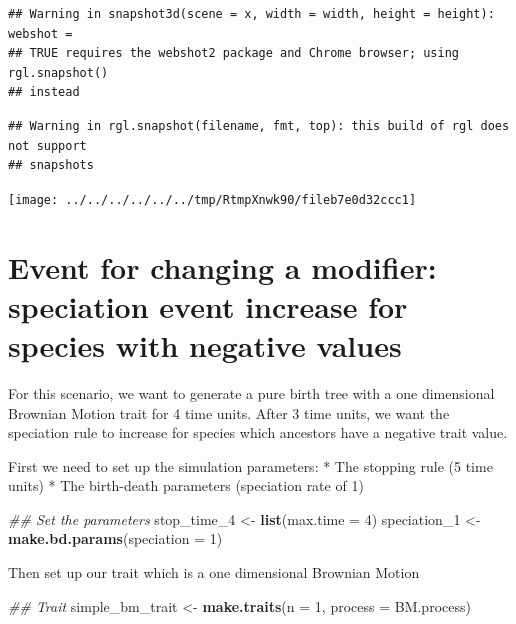 \documentclass[
]{book}
\newenvironment{Shaded}{\begin{snugshade}}{\end{snugshade}}
\newcommand{\CommentTok}[1]{\textcolor[rgb]{0.56,0.35,0.01}{\textit{#1}}}
\newcommand{\DataTypeTok}[1]{\textcolor[rgb]{0.13,0.29,0.53}{#1}}
\newcommand{\DecValTok}[1]{\textcolor[rgb]{0.00,0.00,0.81}{#1}}
\newcommand{\KeywordTok}[1]{\textcolor[rgb]{0.13,0.29,0.53}{\textbf{#1}}}
\newcommand{\NormalTok}[1]{#1}
\newcommand{\StringTok}[1]{\textcolor[rgb]{0.31,0.60,0.02}{#1}}
\begin{document}
\begin{verbatim}
## Warning in snapshot3d(scene = x, width = width, height = height): webshot =
## TRUE requires the webshot2 package and Chrome browser; using rgl.snapshot()
## instead
\end{verbatim}

\begin{verbatim}
## Warning in rgl.snapshot(filename, fmt, top): this build of rgl does not support
## snapshots
\end{verbatim}

\texttt{[image: ../../../../../../tmp/RtmpXnwk90/fileb7e0d32ccc1]}

\hypertarget{EG_change_modif}{%
\section{Event for changing a modifier: speciation event increase for species with negative values}\label{EG_change_modif}}

For this scenario, we want to generate a pure birth tree with a one dimensional Brownian Motion trait for 4 time units.
After 3 time units, we want the speciation rule to increase for species which ancestors have a negative trait value.

First we need to set up the simulation parameters:
* The stopping rule (5 time units)
* The birth-death parameters (speciation rate of 1)

\begin{Shaded}
\begin{Highlighting}[]
\CommentTok{\#\# Set the parameters}
\NormalTok{stop\_time\_}\DecValTok{4}\NormalTok{ \textless{}{-}}\StringTok{ }\KeywordTok{list}\NormalTok{(}\DataTypeTok{max.time =} \DecValTok{4}\NormalTok{)}
\NormalTok{speciation\_}\DecValTok{1}\NormalTok{ \textless{}{-}}\StringTok{ }\KeywordTok{make.bd.params}\NormalTok{(}\DataTypeTok{speciation =} \DecValTok{1}\NormalTok{)}
\end{Highlighting}
\end{Shaded}

Then set up our trait which is a one dimensional Brownian Motion

\begin{Shaded}
\begin{Highlighting}[]
\CommentTok{\#\# Trait}
\NormalTok{simple\_bm\_trait \textless{}{-}}\StringTok{ }\KeywordTok{make.traits}\NormalTok{(}\DataTypeTok{n =} \DecValTok{1}\NormalTok{, }\DataTypeTok{process =}\NormalTok{ BM.process)}
\end{Highlighting}
\end{Shaded}
\end{document}
